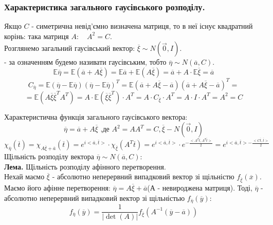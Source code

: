 \subsubsection{Характеристика загального гаусівського розподілу.}
\def\veta{\overline{\eta}}
\def\vxi{\overline{\xi}}
Якщо $C$ - симетрична невід'ємно визначена матриця, то в неї існує квадратний корінь: така матриця $A: \quad A^2 = C.$\\
Розглянемо загальний гаусівський вектор: $\overline{\xi} \sim N(\vec{0}, I) $.\\ \quad {} -  за означенням будемо називати гаусівським, тобто $\overline{\eta} \sim N(\overline{a}, C)$.\\
$$\mathbb{E}\veta = \mathbb{E} \left(  \overline{a} + A \overline{\xi}
 \right) = \mathbb{E} \overline{a} + \mathbb{E} \left( A \overline{\xi} \right) = \overline{a} + A \cdot \mathbb{E} \overline{\xi} = \overline{a}$$
 $$
 C_{\veta} = \mathbb{E}( \veta - \mathbb{E} \veta)( \veta - \mathbb{E} \veta)^T = \mathbb{E}( \overline{a} + A \overline{\xi} - \overline{a})( \overline{a} + A \overline{\xi} - \overline{a})^T =
 $$
 $$
 =\mathbb{E}( A \vxi \vxi^T A^T) = A \cdot \mathbb{E} \left( \vxi \vxi^T \right) \cdot A^T = A \cdot C_{\vxi} \cdot A^T = A \cdot I \cdot A^T = A^2 = C
 $$

Характеристична функція загального гаусівського вектора:\\
$$
\veta = \overline{a}+ A \vxi \text{ ,де }
A^2 = AA^T = C, \overline{\xi} - N(\vec{0}, I)$$
$$
\chi_{\veta} ( \overline{t}) = \chi_{A\vxi + \overline{a}} (\overline{t}) = e^{i <\overline{a}, \overline{t}>} \cdot \chi_{\vxi} \left( A^T \overline{t} \right) =
e^{i <\overline{a}, \overline{t}>} \cdot e^{- \frac{<A^T \overline{t}, A^T \overline{t}>}{2} } = e^{i <\overline{a}, \overline{t}> - \frac{<C \overline{t}, \overline{t}>}{2}  }
$$
Щільність розподілу вектора $\veta  \sim N( \overline{a}, C)$:\\
\textbf{Лема.} Щільність розподілу афінного перетворення. \\
Нехай маємо $\vxi$ - абсолютно неперервний випадковий вектор зі щільністю $f_{\vxi} (\overline{x})$. Маємо його афінне перетворення: $\veta = A\vxi + \overline{a}$(А - невироджена матриця).  Тоді, $\veta$ - абсолютно неперервний випадковий вектор зі щільністью $f_{\veta} (\overline{y})$:
$$
f_{\veta} (\overline{y}) = \frac{1}{ \left| \det(A) \right| }  f_ {\vxi} ( A^{-1}( \overline{y} - \overline{a}) )
$$

